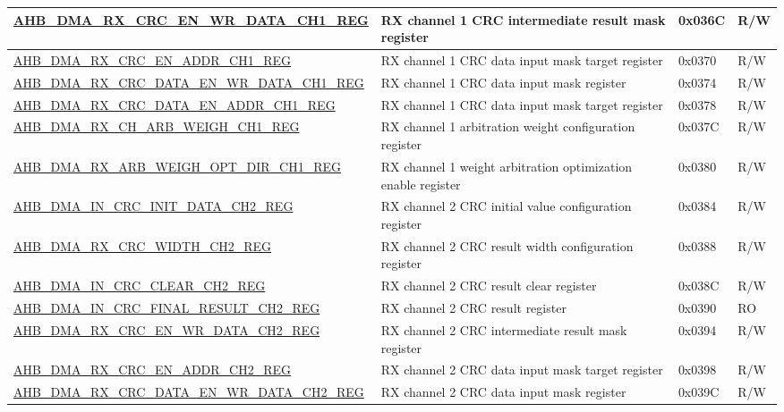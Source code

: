 \begin{longtable}{ | l | p{10cm} | p{1.3cm} | l | }
\hyperref[regdesc:AHBDMARXCRCENWRDATACHNREG]{AHB\_DMA\_RX\_CRC\_EN\_WR\_DATA\_CH1\_REG} & RX channel 1 CRC intermediate result mask register & 0x036C & R/W \\ \hline
\hyperref[regdesc:AHBDMARXCRCENADDRCHNREG]{AHB\_DMA\_RX\_CRC\_EN\_ADDR\_CH1\_REG} & RX channel 1 CRC data input mask target register & 0x0370 & R/W \\ \hline
\hyperref[regdesc:AHBDMARXCRCDATAENWRDATACHNREG]{AHB\_DMA\_RX\_CRC\_DATA\_EN\_WR\_DATA\_CH1\_REG} & RX channel 1 CRC data input mask register & 0x0374 & R/W \\ \hline
\hyperref[regdesc:AHBDMARXCRCDATAENADDRCHNREG]{AHB\_DMA\_RX\_CRC\_DATA\_EN\_ADDR\_CH1\_REG} & RX channel 1 CRC data input mask target register & 0x0378 & R/W \\ \hline
\hyperref[regdesc:AHBDMARXCHARBWEIGHCHNREG]{AHB\_DMA\_RX\_CH\_ARB\_WEIGH\_CH1\_REG} & RX channel 1 arbitration weight configuration register & 0x037C & R/W \\ \hline
\hyperref[regdesc:AHBDMARXARBWEIGHOPTDIRCHNREG]{AHB\_DMA\_RX\_ARB\_WEIGH\_OPT\_DIR\_CH1\_REG} & RX channel 1 weight arbitration optimization enable register & 0x0380 & R/W \\ \hline
\hyperref[regdesc:AHBDMAINCRCINITDATACHNREG]{AHB\_DMA\_IN\_CRC\_INIT\_DATA\_CH2\_REG} & RX channel 2 CRC initial value configuration register & 0x0384 & R/W \\ \hline
\hyperref[regdesc:AHBDMARXCRCWIDTHCHNREG]{AHB\_DMA\_RX\_CRC\_WIDTH\_CH2\_REG} & RX channel 2 CRC result width configuration register & 0x0388 & R/W \\ \hline
\hyperref[regdesc:AHBDMAINCRCCLEARCHNREG]{AHB\_DMA\_IN\_CRC\_CLEAR\_CH2\_REG} & RX channel 2 CRC result clear register & 0x038C & R/W \\ \hline
\hyperref[regdesc:AHBDMAINCRCFINALRESULTCHNREG]{AHB\_DMA\_IN\_CRC\_FINAL\_RESULT\_CH2\_REG} & RX channel 2 CRC result register & 0x0390 & RO \\ \hline
\hyperref[regdesc:AHBDMARXCRCENWRDATACHNREG]{AHB\_DMA\_RX\_CRC\_EN\_WR\_DATA\_CH2\_REG} & RX channel 2 CRC intermediate result mask register & 0x0394 & R/W \\ \hline
\hyperref[regdesc:AHBDMARXCRCENADDRCHNREG]{AHB\_DMA\_RX\_CRC\_EN\_ADDR\_CH2\_REG} & RX channel 2 CRC data input mask target register & 0x0398 & R/W \\ \hline
\hyperref[regdesc:AHBDMARXCRCDATAENWRDATACHNREG]{AHB\_DMA\_RX\_CRC\_DATA\_EN\_WR\_DATA\_CH2\_REG} & RX channel 2 CRC data input mask register & 0x039C & R/W \\ \hline

\end{longtable}
